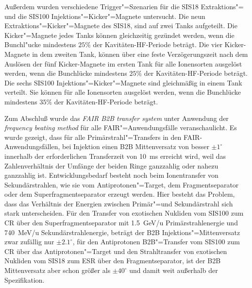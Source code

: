 Au\ss{}erdem wurden verschiedene Trigger"=Szenarien für die SIS18 Extraktions"= und die SIS100 Injektions"=Kicker"=Magnete untersucht. Die neun Extraktions"=Kicker"=Magnete des SIS18, sind auf zwei Tanks aufgeteilt. Die Kicker"=Magnete jedes Tanks k\"onnen gleichzeitig gez\"undet werden, wenn die Bunchl"ucke mindestens $25\%$ der Kavit\"aten-HF-Periode beträgt. Die vier Kicker-Magnete in dem zweiten Tank, k\"onnen \"uber eine feste Verz\"ogerungszeit nach dem Ausl\"osen der f\"unf Kicker-Magnete im ersten Tank f\"ur alle Ionensorten ausgel\"ost werden, wenn die Bunchl\"ucke mindestens $25\%$ der Kavit\"aten-HF-Periode betr\"agt. Die sechs SIS100 Injektions"=Kicker"=Magnete sind gleichm\"a\ss{}ig in einem Tank verteilt. Sie k\"onnen f\"ur alle Ionensorten ausgel\"ost werden, wenn die Bunchl\"ucke mindestens $35\%$ der Kavitäten-HF-Periode betr\"agt.  

Zum Abschlu\ss{} wurde das \textit{FAIR B2B transfer system} unter Anwendung der  \textit{frequency beating method} f\"ur alle FAIR"=Anwendungsf\"alle veranschaulicht. Es wurde gezeigt, dass f\"ur alle Prim\"arstrahl"=Transfers in den FAIR-Anwendungsf\"allen, bei Injektion einen B2B Mittenversatz von besser $\pm1^\circ$ innerhalb der erforderlichen Transferzeit von \SI{10}{\ms} erreicht wird, weil das Zahlenverh\"altnis der Umf\"ange der beiden Ringe ganzzahlig oder nahezu ganzzahlig ist. Entwicklungsbedarf besteht noch beim Ionentransfer von Sekund\"arstrahlen, wie sie vom Antiprotonen"=Target, dem Fragmentseparator oder dem Superfragmentseparator erzeugt werden. Hier besteht das Problem, dass das Verh\"altnis der Energien zwischen Prim\"ar"=und
Sekund\"arstrahl sich stark unterscheiden. F\"ur den Transfer von exotischen Nukliden vom SIS100 zum CR \"uber den Superfragmentseparator mit \SI{1.5}{GeV/u} Prim\"arstrahlenergie und \SI{740}{MeV/u} Sekund\"arstrahlenergie, betr\"agt der B2B Injektions"=Mittenversatz zwar zufällig nur $\pm2.1^\circ$, f\"ur den Antiprotonen B2B"=Transfer vom SIS100 zum CR \"uber das Antiprotonen"=Target und den Strahltransfer von exotischen Nukliden vom SIS18 zum ESR \"uber den Fragmentseparator, ist der B2B Mittenversatz aber schon gr\"o\ss{}er als $\pm40^\circ$ und damit weit au\ss{}erhalb der Spezifikation.

